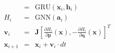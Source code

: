 \begin{eqnarray}
	[\mathbf{a}_i, \mathbf{h}_{i+1}] &=&  \text{GRU}(\mathbf{x}_i,\mathbf{h}_i)\\
	 H_i&=& \text{GNN}(\mathbf{a}_i)\\
	 \mathbf{v}_i&=&\mathbf{J}\left[\frac{\partial H_{i}}{\partial\mathbf{p}}(\mathbf{x}),-\frac{\partial H_{i}}{\partial\mathbf{q}}(\mathbf{x})\right]^T\\
	 \mathbf{x}_{i+1} &=& \mathbf{x}_i + \mathbf{v}_i \cdot dt
\end{eqnarray}
